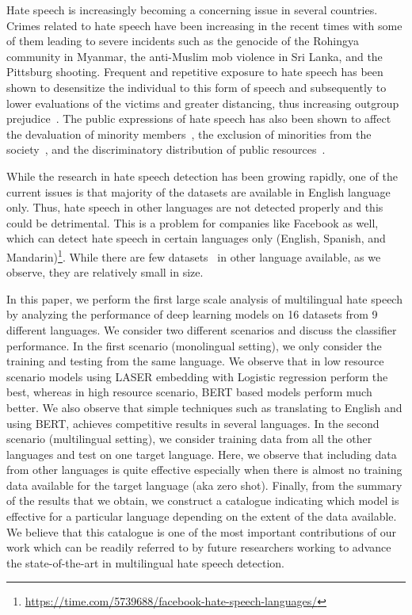\documentclass[runningheads]{llncs}
\begin{document}
Hate speech is increasingly becoming a concerning issue in several countries. Crimes related to hate speech have been increasing in the recent times with some of them leading to severe incidents such as the genocide of the Rohingya community in Myanmar, the anti-Muslim mob violence in Sri Lanka, and the Pittsburg shooting. Frequent and repetitive exposure to hate speech has been shown to desensitize the individual to this form of speech and subsequently to lower evaluations of the victims and greater distancing, thus increasing outgroup prejudice~\cite{soral2018exposure}. The public expressions of hate speech has also been shown to affect the devaluation of minority members~\cite{greenberg1985effect}, the exclusion of minorities from the society~\cite{mullen2003ethnophaulisms}, and the discriminatory distribution of public resources~\cite{fasoli2015labelling}. 

While the research in hate speech detection has been growing rapidly, one of the current issues is that majority of the datasets are available in English language only. Thus, hate speech in other languages are not detected properly and this could be detrimental. This is a problem for companies like Facebook as well, which can detect hate speech in certain languages only (English, Spanish, and Mandarin)\footnote{\url{https://time.com/5739688/facebook-hate-speech-languages/}}. While there are few datasets~\cite{basile2019semeval,ousidhoum2019multilingual} in other language available, as we observe, they are relatively small in size. 


In this paper, we perform the first large scale analysis of multilingual hate speech by analyzing the performance of deep learning models on 16 datasets from 9 different languages. We consider two different scenarios and discuss the classifier performance. In the first scenario (monolingual setting), we only consider the training and testing from the same language. We observe that in low resource scenario models using LASER embedding with Logistic regression perform the best, whereas in high resource scenario, BERT based models perform much better. We also observe that simple techniques such as translating to English and using BERT, achieves competitive results in several languages. In the second scenario (multilingual setting), we consider training data from all the other languages and test on one target language. Here, we observe that including data from other languages is quite effective especially when there is almost no training data available for the target language (aka zero shot). Finally, from the summary of the results that we obtain, we construct a catalogue indicating which model is effective for a particular language depending on the extent of the data available. We believe that this catalogue is one of the most important contributions of our work which can be readily referred to by future researchers working to advance the state-of-the-art in multilingual hate speech detection. 
\end{document}
